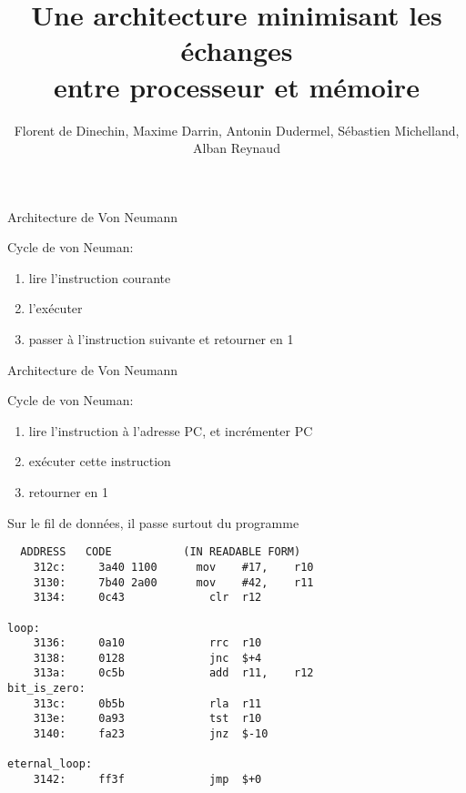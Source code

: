 \documentclass[slidetop,11pt,table]{beamer}
\title{Une architecture minimisant les échanges\\ entre processeur et mémoire}
\author{Florent de Dinechin, Maxime Darrin, Antonin Dudermel, Sébastien Michelland, Alban Reynaud}
\date{}
\begin{document}
\frame{\titlepage}


\begin{frame}{Architecture de Von Neumann}
  \begin{figure}[b]
    \begin{center}
    \end{center}
  \end{figure}
  Cycle de von Neuman:
  \begin{enumerate}
  \item lire l'instruction courante
  \item l'exécuter
  \item passer à l'instruction suivante et retourner en 1
  \end{enumerate}
\end{frame}


\begin{frame}{Architecture de Von Neumann}
  \begin{figure}[b]
    \begin{center}
    \end{center}
  \end{figure}
  Cycle de von Neuman:
  \begin{enumerate}
  \item lire l'instruction à l'adresse PC, et incrémenter PC
  \item exécuter cette instruction
   
  \item retourner en 1
  \end{enumerate}
\end{frame}



\begin{frame}[fragile]{Sur le fil de données, il passe surtout du programme}
\begin{verbatim}
  ADDRESS   CODE           (IN READABLE FORM) 
    312c:	  3a40 1100      mov	#17,	r10	
    3130:	  7b40 2a00      mov	#42,	r11	
    3134:	  0c43       	   clr	r12		

loop:
    3136:	  0a10       	   rrc	r10		
    3138:	  0128       	   jnc	$+4      
    313a:	  0c5b       	   add	r11,	r12	
bit_is_zero:
    313c:	  0b5b       	   rla	r11		
    313e:	  0a93       	   tst	r10		
    3140:	  fa23       	   jnz	$-10     	

eternal_loop:
    3142:	  ff3f       	   jmp	$+0      	
\end{verbatim}
\end{frame}
\end{document}
